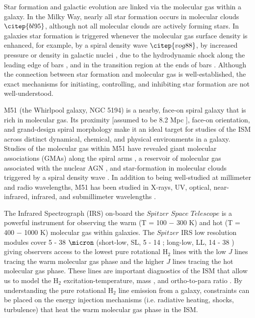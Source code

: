 \documentclass[manuscript]{aastex}
\begin{document}
Star formation and galactic evolution are linked via the molecular gas within a galaxy.  In the Milky Way, nearly all star formation occurs in molecular clouds $\citep{bl95}$, although not all molecular clouds are actively forming stars.  In galaxies star formation is triggered whenever the molecular gas surface density is enhanced, for example, by a spiral density wave $\citep{vog88}$, by increased pressure or density in galactic nuclei \citep{you91, she05}, due to the hydrodynamic shock along the leading edge of bars \citep{she00, she02}, and in the transition region at the ends of bars \citep{kl91}.  Although the connection between star formation and molecular gas is well-established, the exact mechanisms for initiating, controlling, and inhibiting star formation are not well-understood.

M51 (the Whirlpool galaxy, NGC 5194) is a nearby, face-on spiral galaxy that is rich in molecular gas.  Its proximity [assumed to be 8.2 Mpc \citep{tul88}], face-on orientation, and grand-design spiral morphology make it an ideal target for studies of the ISM across distinct dynamical, chemical, and physical environments in a galaxy.  Studies of the molecular gas within M51 have revealed giant molecular associations (GMAs) along the spiral arms \citep{aal99}, a reservoir of molecular gas associated with the nuclear AGN \citep{sco98}, and star-formation in molecular clouds triggered by a spiral density wave \citep{vog88}.  In addition to being well-studied at millimeter and radio wavelengths, M51 has been studied in X-rays, UV, optical, near-infrared, infrared,  and submillimeter wavelengths \citep{pal85, ter01, sco01, cal05, mat04}.  

The Infrared Spectrograph (IRS) \citep{hou04} on-board the $Spitzer$ $Space$ $Telescope$ is a powerful instrument for observing the warm (T = 100 $-$ 300 K) and hot (T = 400 $-$ 1000 K) molecular gas within galaxies.  The $Spitzer$ IRS low resolution modules cover 5 - 38 $\micron$ (short-low, SL, 5 - 14 \micron; long-low, LL, 14 - 38 \micron) giving observers access to the lowest pure rotational $\mathrm{H_2}$ lines with the low $J$ lines tracing the warm molecular gas phase and the higher $J$ lines tracing the hot molecular gas phase.  These lines are important diagnostics of the ISM that allow us to  model the $\mathrm{H_2}$ excitation-temperature, mass \citep{rig02, hig06}, and ortho-to-para ratio \citep{neu98, neu06}.  By understanding the pure rotational $\mathrm{H_2}$ line emission from a galaxy, constraints can be placed on the energy injection mechanisms (i.e. radiative heating, shocks, turbulence) that heat the warm molecular gas phase in the ISM.  
\end{document}
